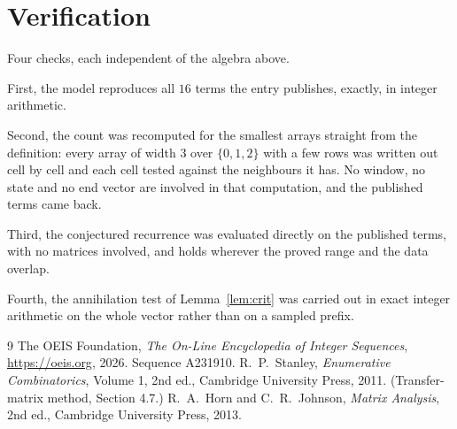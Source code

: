 \documentclass[11pt,a4paper]{article}
\theoremstyle{plain}
\theoremstyle{definition}
\begin{document}
\section{Verification}

Four checks, each independent of the algebra above.

First, the model reproduces all $16$ terms the entry publishes, exactly, in integer
arithmetic.

Second, the count was recomputed for the smallest arrays straight from the definition: every
array of width $3$ over $\{0,1,2\}$ with a few rows was written out cell by cell and each cell
tested against the neighbours it has. No window, no state and no end vector are involved in that
computation, and the published terms came back.

Third, the conjectured recurrence was evaluated directly on the published terms, with no
matrices involved, and holds wherever the proved range and the data overlap.

Fourth, the annihilation test of Lemma~\ref{lem:crit} was carried out in exact integer
arithmetic on the whole vector rather than on a sampled prefix.

\begin{thebibliography}{9}
 The OEIS Foundation, \emph{The On-Line Encyclopedia of Integer
Sequences}, \url{https://oeis.org}, 2026. Sequence A231910.
 R.~P.~Stanley, \emph{Enumerative Combinatorics}, Volume 1, 2nd ed.,
Cambridge University Press, 2011. (Transfer-matrix method, Section 4.7.)
 R.~A.~Horn and C.~R.~Johnson, \emph{Matrix Analysis}, 2nd ed., Cambridge
University Press, 2013.
\end{thebibliography}
\end{document}
